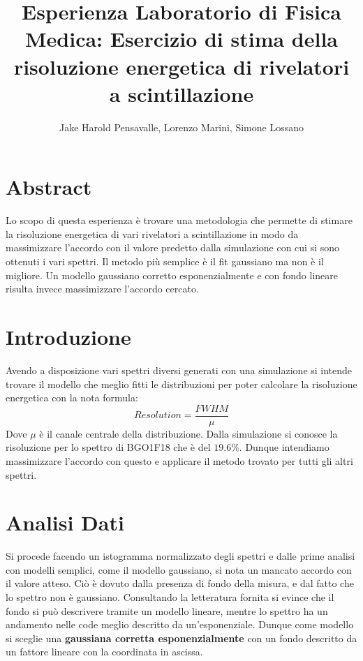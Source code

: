 \documentclass[a4paper]{article}
\title{Esperienza Laboratorio di Fisica Medica: Esercizio di stima della risoluzione energetica di rivelatori a scintillazione}
\author{Jake Harold Pensavalle, Lorenzo Marini, Simone Lossano}
\begin{document}
	\maketitle
	\newpage
	\tableofcontents
	\newpage
\section{Abstract}
Lo scopo di questa esperienza è trovare una metodologia che permette di stimare la risoluzione energetica di vari rivelatori a scintillazione in modo da massimizzare l'accordo con il valore predetto dalla simulazione con cui si sono ottenuti i vari spettri. Il metodo più semplice è il fit gaussiano ma non è il migliore. Un modello gaussiano corretto esponenzialmente e con fondo lineare risulta invece massimizzare l'accordo cercato.
\section{Introduzione}
Avendo a disposizione vari spettri diversi generati con una simulazione si intende trovare il modello che meglio fitti le distribuzioni per poter calcolare la risoluzione energetica con la nota formula:
\begin{equation}
Resolution=\frac{FWHM}{\mu}
\end{equation}
Dove $\mu$ è il canale centrale della distribuzione. Dalla simulazione si conosce la risoluzione per lo spettro di BGO1F18 che è del $19.6\%$. Dunque intendiamo massimizzare l'accordo con questo e applicare il metodo trovato per tutti gli altri spettri.
\section{Analisi Dati}
Si procede facendo un istogramma normalizzato degli spettri e dalle prime analisi con modelli semplici, come il modello gaussiano, si nota un mancato accordo con il valore atteso. Ciò è dovuto dalla presenza di fondo della misura, e dal fatto che lo spettro non è gaussiano. Consultando la letteratura fornita si evince che il fondo si può descrivere tramite un modello lineare, mentre lo spettro ha un andamento nelle code meglio descritto da un'esponenziale. Dunque come modello si sceglie una \textbf{gaussiana corretta esponenzialmente} con un fondo descritto da un fattore lineare con la coordinata in ascissa.
\end{document}
